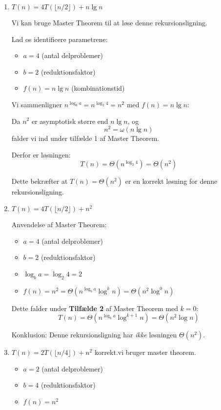 \documentclass{article}
\theoremstyle{definition}
\begin{document}
\begin{enumerate}
    \item $T(n) = 4T(\lfloor n/2 \rfloor) + n\lg n$
    
    Vi kan bruge Master Theorem til at løse denne rekursionsligning.
    
    Lad os identificere parametrene:
    \begin{itemize}
        \item $a = 4$ (antal delproblemer)
        \item $b = 2$ (reduktionsfaktor)
        \item $f(n) = n\lg n$ (kombinationstid)
    \end{itemize}
    
    Vi sammenligner $n^{\log_b a} = n^{\log_2 4} = n^2$ med $f(n) = n\lg n$:
    
    Da $n^2$ er asymptotisk større end $n\lg n$, og
    \[ n^2 = \omega(n\lg n) \]
    falder vi ind under tilfælde 1 af Master Theorem.
    
    Derfor er løsningen:
    \[ T(n) = \Theta(n^{\log_2 4}) = \Theta(n^2) \]
    
    Dette bekræfter at $T(n) = \Theta(n^2)$ er en korrekt løsning for denne rekursionsligning.
    
    \item $T(n) = 4T(\lfloor n/2 \rfloor) + n^2$
    
    Anvendelse af Master Theorem:
    \begin{itemize}
        \item $a = 4$ (antal delproblemer)
        \item $b = 2$ (reduktionsfaktor)
        \item $\log_b a = \log_2 4 = 2$
        \item $f(n) = n^2 = \Theta(n^{\log_b a} \log^k n) = \Theta(n^2 \log^0 n)$
    \end{itemize}
    
    Dette falder under \textbf{Tilfælde 2} af Master Theorem med $k = 0$:
    \[ T(n) = \Theta(n^{\log_b a} \log^{k+1} n) = \Theta(n^2 \log n) \]
    
    Konklusion: Denne rekursionsligning har \textit{ikke} løsningen $\Theta(n^2)$.
    
    \item $T(n) = 2T(\lfloor n/4 \rfloor) + n^2$
    korrekt.vi bruger master theorem. 

    \begin{itemize}
        \item $a = 2$ (antal delproblemer)
        \item $b = 4$ (reduktionsfaktor)
        \item $f(n) = n^2$ 
    \end{itemize}


\end{enumerate}
\end{document}
